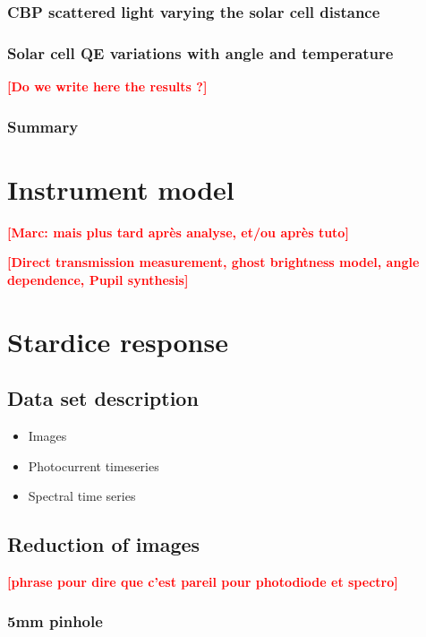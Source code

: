 \documentclass[printer]{aa}
\newcommand{\todo}[1]{\textbf{\textcolor{red}{[#1]}}\xspace}
\begin{document}
\subsubsection{CBP scattered light varying the solar cell distance}


\subsubsection{Solar cell QE variations with angle and temperature}

\todo{Do we write here the results ?}


\subsubsection{Summary}


\section{Instrument model}\label{sec:model}

\todo{Marc: mais plus tard après analyse, et/ou après tuto}

\todo{Direct transmission measurement, ghost brightness model, angle dependence,  Pupil synthesis}

\section{Stardice response}
\label{sec:dataset}

\subsection{Data set description}
\label{sec:datadesc}

\begin{itemize}
\item Images
\item Photocurrent timeseries
\item Spectral time series
\end{itemize}

\subsection{Reduction of images}
\label{sec:photometry}

\todo{phrase pour dire que c'est pareil pour photodiode et spectro}

\subsubsection{5mm pinhole}
\end{document}
